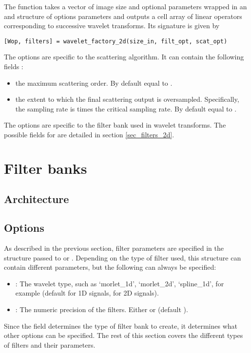 \documentclass{article}
\begin{document}
The  function takes a  vector of image size and optional parameters wrapped in an  and  structure of options parameters and outputs a cell array of linear operators corresponding to successive wavelet transforms. Its signature  is given by
\begin{lstlisting}
[Wop, filters] = wavelet_factory_2d(size_in, filt_opt, scat_opt)
\end{lstlisting}
The  options are specific to the scattering algorithm. It can contain the following fields :
\begin{itemize}
	\item {} the maximum scattering order. By default equal to .
	\item {} the extent to which the final scattering output is oversampled. Specifically, the sampling rate is  times the critical sampling rate. By default equal to .
\end{itemize}
The  options are specific to the filter bank used in wavelet transforms. The possible fields for  are detailed in section \ref{sec_filters_2d}.

\section{Filter banks \label{sec:filters}}

\subsection{Architecture \label{sub:filters-architecture}}

\subsection{Options \label{sub:filters-options}}


As described in the previous section, filter parameters are specified in the  structure passed to  or . Depending on the type of filter used, this structure can contain different parameters, but the following can always be specified:
\begin{itemize}
	\item {}: The wavelet type, such as `morlet\_1d', `morlet\_2d', `spline\_1d', for example (default  for 1D signals,  for 2D signals).
	\item {}: The numeric precision of the filters. Either  or  (default ).
\end{itemize}
Since the  field determines the type of filter bank to create, it determines what other options can be specified. The rest of this section covers the different types of filters and their parameters.
\end{document}
